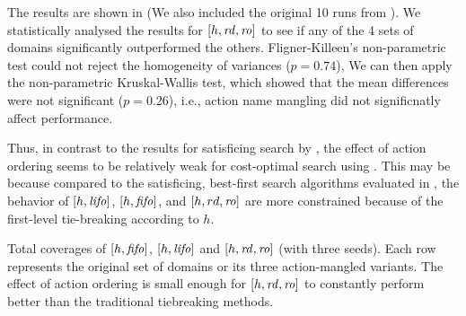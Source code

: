 The results are shown in  (We
also included the original 10 runs from  ).
We statistically analysed the results for $[h,\mbox{\textit{rd}},\mbox{\textit{ro}}]$ 
to see if any of the 4 sets of domains
significantly outperformed the others.
Fligner-Killeen's non-parametric test could not reject the homogeneity of variances ($p=0.74$),
We can then apply the non-parametric Kruskal-Wallis test,
which showed that the mean differences were not significant ($p=0.26$),
i.e., action name mangling did not significnatly affect performance.

Thus, in contrast to the results for satisficing search by \cite{vallati2015effective}, 
the effect of action ordering  seems to be relatively weak for cost-optimal search using \astar.
This may be because 
compared to the satisficing, best-first search algorithms evaluated in \cite{vallati2015effective},
the behavior of $[h,\mbox{\textit{lifo}}]$, $[h,\mbox{\textit{fifo}}]$, and $[h,rd,\mbox{\textit{ro}}]$ are more
constrained because of the first-level tie-breaking according to $h$.

\begin{table}[tb]
 \setlength{\tabcolsep}{0.2em}
 \centering {}
 
 \caption{Total coverages of $[h,\mbox{\textit{fifo}}]$, $[h,\mbox{\textit{lifo}}]$
 and $[h,\mbox{\textit{rd}},\mbox{\textit{ro}}]$ (with three seeds). Each row represents the original set of
 domains or its three action-mangled variants. The effect
 of action ordering is small enough for $[h,\mbox{\textit{rd}},\mbox{\textit{ro}}]$ to
 constantly perform better than the traditional tiebreaking methods.}
 \label{actionordering-robustness}
\end{table}

